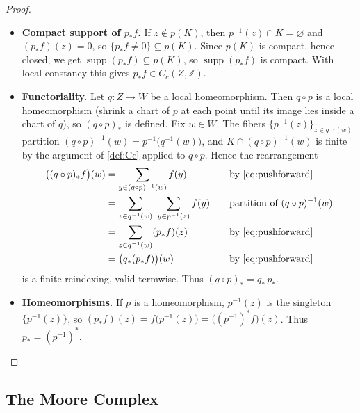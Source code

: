 \documentclass{extracta-temp-26}
\makeatletter
\numberwithin{equation}{section}
\theoremstyle{definition}
\theoremstyle{remark}
\newcommand{\Z}{\mathbb{Z}}
\DeclareMathOperator{\supp}{supp}
\newcommand{\step}[1]{\textbf{#1}}
\newcommand{\keepwithnext}{\leavevmode\par\nobreak\@afterheading}
\newcommand{\subhead}[1]{\subsection*{#1}\keepwithnext}
\makeatother
\begin{document}
\begin{proof}
\begin{itemize}
\begin{equation}
\begin{aligned}
&=(p_*f)(z).&&\quad\text{by \eqref{eq:pushforward}}
\end{aligned}
\end{equation}
As \(z\in Z\) was arbitrary, \(p_*f\) is locally constant.
\item \step{Compact support of \(p_*f\).}
If \(z\notin p(K)\), then \(p^{-1}(z)\cap K=\varnothing\) and \((p_*f)(z)=0\), so \(\{p_*f\neq0\}\subseteq p(K)\).
Since \(p(K)\) is compact, hence closed, we get \(\supp(p_*f)\subseteq p(K)\), so \(\supp(p_*f)\) is compact.
With local constancy this gives \(p_*f\in C_c(Z,\Z)\).
\item \step{Functoriality.}
Let \(q\colon Z\to W\) be a local homeomorphism.
Then \(q\circ p\) is a local homeomorphism (shrink a chart of \(p\) at each point until its image lies inside a chart of \(q\)), so \((q\circ p)_*\) is defined.
Fix \(w\in W\).
The fibers \(\{p^{-1}(z)\}_{z\in q^{-1}(w)}\) partition \((q\circ p)^{-1}(w)=p^{-1}\bigl(q^{-1}(w)\bigr)\), and \(K\cap(q\circ p)^{-1}(w)\) is finite by the argument of \cref{def:Cc} applied to \(q\circ p\).
Hence the rearrangement
\begin{equation}\label{eq:pf-functorial}
\begin{aligned}
\bigl((q\circ p)_*f\bigr)(w)
&=\sum_{y\in(q\circ p)^{-1}(w)}f(y)&&\quad\text{by \eqref{eq:pushforward}}\\
&=\sum_{z\in q^{-1}(w)}\ \sum_{y\in p^{-1}(z)}f(y)&&\quad\text{partition of \((q\circ p)^{-1}(w)\)}\\
&=\sum_{z\in q^{-1}(w)}(p_*f)(z)&&\quad\text{by \eqref{eq:pushforward}}\\
&=\bigl(q_*(p_*f)\bigr)(w)&&\quad\text{by \eqref{eq:pushforward}}
\end{aligned}
\end{equation}
is a finite reindexing, valid termwise.
Thus \((q\circ p)_*=q_*\,p_*\).
\item \step{Homeomorphisms.}
If \(p\) is a homeomorphism, \(p^{-1}(z)\) is the singleton \(\{p^{-1}(z)\}\), so \((p_*f)(z)=f\bigl(p^{-1}(z)\bigr)=\bigl((p^{-1})^*f\bigr)(z)\). Thus \(p_*=(p^{-1})^*\).\qedhere
\end{itemize}
\end{proof}

\subhead{The Moore Complex}
\end{document}
